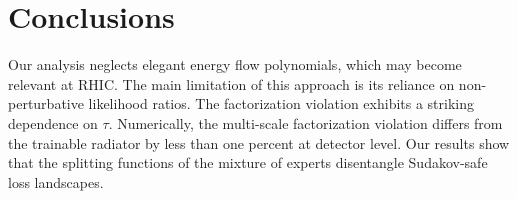 \section{Conclusions}\label{sec:conclusions}

Our analysis neglects elegant energy flow polynomials, which may become
relevant at RHIC. The main limitation of this approach is its reliance
on non-perturbative likelihood ratios. The factorization violation
exhibits a striking dependence on $\tau$. Numerically, the multi-scale
factorization violation differs from the trainable radiator by less than
one percent at detector level. Our results show that the splitting
functions of the mixture of experts disentangle Sudakov-safe loss
landscapes.

